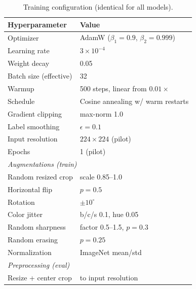 \documentclass[journal]{IEEEtran}
\begin{document}
\begin{table}[!t]
\renewcommand{\arraystretch}{1.15}
\caption{Training configuration (identical for all models).}
\label{tab:hyper}
\centering
\setlength{\tabcolsep}{4pt}
\begin{tabular}{ll}
\toprule
Hyperparameter & Value \\
\midrule
Optimizer & AdamW ($\beta_1{=}0.9$, $\beta_2{=}0.999$) \\
Learning rate & $3\times10^{-4}$ \\
Weight decay & 0.05 \\
Batch size (effective) & 32 \\
Warmup & 500 steps, linear from $0.01\times$ \\
Schedule & Cosine annealing w/ warm restarts \\
Gradient clipping & max-norm 1.0 \\
Label smoothing & $\epsilon = 0.1$ \\
Input resolution & $224\times224$ (pilot) \\
Epochs & 1 (pilot) \\
\midrule
\multicolumn{2}{l}{\textit{Augmentations (train)}} \\
Random resized crop & scale 0.85--1.0 \\
Horizontal flip & $p = 0.5$ \\
Rotation & $\pm 10^{\circ}$ \\
Color jitter & b/c/s 0.1, hue 0.05 \\
Random sharpness & factor 0.5--1.5, $p{=}0.3$ \\
Random erasing & $p = 0.25$ \\
Normalization & ImageNet mean/std \\
\midrule
\multicolumn{2}{l}{\textit{Preprocessing (eval)}} \\
Resize + center crop & to input resolution \\
\bottomrule
\end{tabular}
\end{table}
\end{document}
